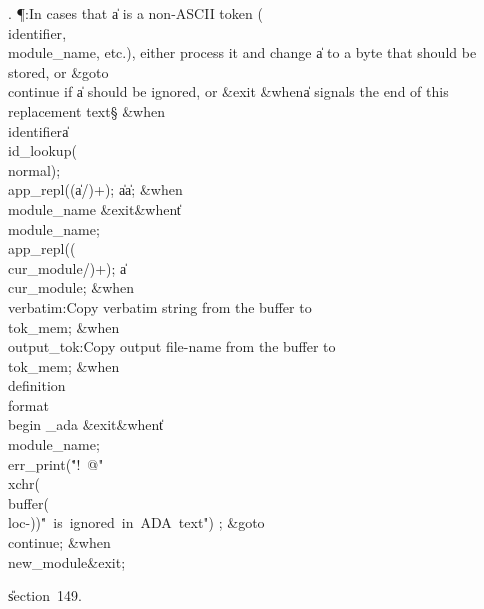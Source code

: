 . \P\?:In cases that \|a is a non-ASCII token (\\{identifier}, %
\\{module\_name}, etc.), either process it and change \|a to a byte that should
be stored, or \&{goto}\8\\{continue} if \|a should be ignored, or \?\&{exit}\8%
\&{when}\?\8\|a signals the end of this replacement text\X\S\?\6
\4\&{when}\8\\{identifier}\KR\8\|a\?\K\?\\{id\_lookup}\?\1(\?\\{normal}\?\2)\?;%
\5
\\{app\_repl}\?\1(\1(\?\|a\?/\2)+\2)\?;\5
\|a\?\K\?\|a\?\?;\6
\4\&{when}\8\\{module\_name}\KR\6
\?\&{exit}\8\&{when}\?\8\|t\?\I\?\\{module\_name};\6
\\{app\_repl}\?\1(\1(\?\\{cur\_module}\?/\2)+\2)\?;\5
\|a\?\K\?\\{cur\_module}\?\?;\6
\4\&{when}\8\\{verbatim}\KR\8:Copy verbatim string from the buffer to %
\\{tok\_mem}\X;\6
\4\&{when}\8\\{output\_tok}\KR\8:Copy output file-name from the buffer to %
\\{tok\_mem}\X;\6
\4\&{when}\8\\{definition}\?\mathrel{\.|}\?\\{format}\?\mathrel{\.|}\?\\{begin%
\_ada}\KR\6
\?\&{exit}\8\&{when}\?\8\|t\?\I\?\\{module\_name};\6
\\{err\_print}\?\1(\?\.{"!\ @"}\?\mathbin{\.\&}\?\\{xchr}\?\1(\?\\{buffer}\?\1(%
\?\\{loc}\?-\?\2)\2)\mathbin{\.\&}\?\.{"\ is\ ignored\ in\ ADA\ text"}\?\2)%
\?;\6
\&{goto}\8\\{continue};\6
\4\&{when}\8\\{new\_module}\KR\8\&{exit};\par
\U section~149.\fi

